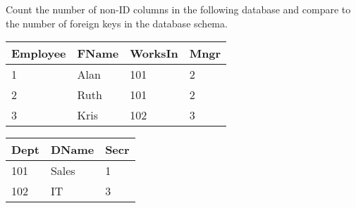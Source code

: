 
Count the number of non-ID columns in the following database and compare to the number of foreign keys in the database schema.

    \begin{minipage}{0.48\textwidth}

      \begin{tabular}{|l|l|l|l|}
        \hline
        Employee & FName & WorksIn & Mngr \\ \hline
        1        & Alan  & 101     & 2    \\ \hline
        2        & Ruth  & 101     & 2    \\ \hline
        3        & Kris  & 102     & 3    \\ \hline
      \end{tabular}
    \end{minipage}

    \begin{minipage}{0.48\textwidth}

      \begin{tabular}{|l|l|l|}
        \hline
        Dept & DName & Secr \\ \hline
        101  & Sales & 1    \\
        102  & IT    & 3    \\
      \end{tabular}
    \end{minipage}


